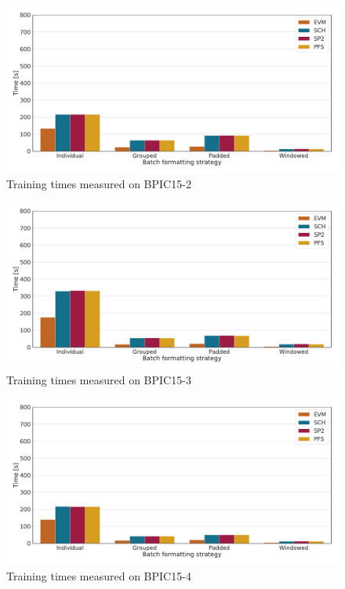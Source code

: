 \begin{figure}
    \centering
    \includegraphics[width=\textwidth]{gfx/bpic2015_2/train_timings.pdf}
    \caption{Training times measured on BPIC15-2}
    \label{fig:BPIC15-2-training-timings}
\end{figure}
\begin{figure}
    \centering
    \includegraphics[width=\textwidth]{gfx/bpic2015_3/train_timings.pdf}
    \caption{Training times measured on BPIC15-3}
    \label{fig:BPIC15-3-training-timings}
\end{figure}
\begin{figure}
    \centering
    \includegraphics[width=\textwidth]{gfx/bpic2015_4/train_timings.pdf}
    \caption{Training times measured on BPIC15-4}
    \label{fig:BPIC15-4-training-timings}
\end{figure}
